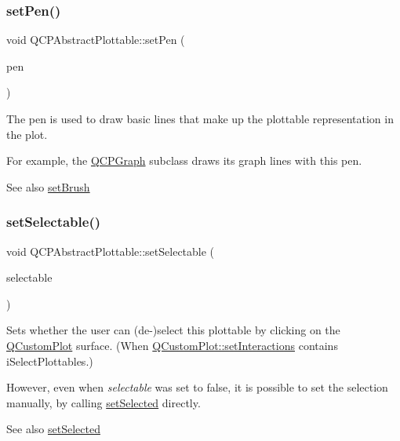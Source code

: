 \subsubsection{\texorpdfstring{set\+Pen()}{setPen()}}
{\footnotesize\ttfamily void Q\+C\+P\+Abstract\+Plottable\+::set\+Pen (\begin{DoxyParamCaption}\item[{const Q\+Pen \&}]{pen }\end{DoxyParamCaption})}

The pen is used to draw basic lines that make up the plottable representation in the plot.

For example, the \hyperlink{class_q_c_p_graph}{Q\+C\+P\+Graph} subclass draws its graph lines with this pen.

\begin{DoxySeeAlso}{See also}
\hyperlink{class_q_c_p_abstract_plottable_a7a4b92144dca6453a1f0f210e27edc74}{set\+Brush} 
\end{DoxySeeAlso}
\hypertarget{class_q_c_p_abstract_plottable_a22c69299eb5569e0f6bf084877a37dc4}{}\label{class_q_c_p_abstract_plottable_a22c69299eb5569e0f6bf084877a37dc4} 
\subsubsection{\texorpdfstring{set\+Selectable()}{setSelectable()}}
{\footnotesize\ttfamily void Q\+C\+P\+Abstract\+Plottable\+::set\+Selectable (\begin{DoxyParamCaption}\item[{bool}]{selectable }\end{DoxyParamCaption})}

Sets whether the user can (de-\/)select this plottable by clicking on the \hyperlink{class_q_custom_plot}{Q\+Custom\+Plot} surface. (When \hyperlink{class_q_custom_plot_a5ee1e2f6ae27419deca53e75907c27e5}{Q\+Custom\+Plot\+::set\+Interactions} contains i\+Select\+Plottables.)

However, even when {\itshape selectable} was set to false, it is possible to set the selection manually, by calling \hyperlink{class_q_c_p_abstract_plottable_afbd5428c2952f59d952e11ab5cd79176}{set\+Selected} directly.

\begin{DoxySeeAlso}{See also}
\hyperlink{class_q_c_p_abstract_plottable_afbd5428c2952f59d952e11ab5cd79176}{set\+Selected} 
\end{DoxySeeAlso}
\hypertarget{class_q_c_p_abstract_plottable_afbd5428c2952f59d952e11ab5cd79176}{}\label{class_q_c_p_abstract_plottable_afbd5428c2952f59d952e11ab5cd79176} 
